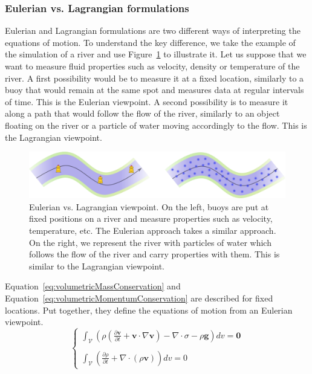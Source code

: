 \subsubsection{Eulerian vs. Lagrangian formulations}
\label{subsubsec:starMechanics_eulerianLagrangian}
Eulerian and Lagrangian formulations are two different ways of interpreting the equations of motion.
To understand the key difference, we take the example of the simulation of a river and use Figure~\ref{fig:EulerianVsLagrangian} to illustrate it.
Let us suppose that we want to measure fluid properties such as velocity, density or temperature of the river.
A first possibility would be to measure it at a fixed location, similarly to a buoy that would remain at the same spot and measures data at regular intervals of time. This is the Eulerian viewpoint. A second possibility is to measure it along a path that would follow the flow of the river, similarly to an object floating on the river or a particle of water moving accordingly to the flow. This is the Lagrangian viewpoint.
\begin{figure}[!ht]
	\centering
	\includegraphics[width=\linewidth]{images/continuum_mechanics/eulerianVsLagrangian.png}
	\caption[STAR mechanics: Eulerian vs. Lagrangian]{\label{fig:EulerianVsLagrangian} Eulerian vs. Lagrangian viewpoint. On the left, buoys are put at fixed positions on a river and measure properties such as velocity, temperature, etc. The Eulerian approach takes a similar approach. On the right, we represent the river with particles of water which follows the flow of the river and carry properties with them. This is similar to the Lagrangian viewpoint.}
\end{figure}
Equation~\eqref{eq:volumetricMassConservation} and Equation~\eqref{eq:volumetricMomentumConservation} are described for fixed locations. Put together, they define the equations of motion from an Eulerian viewpoint.
\begin{equation}
\label{eq:eulerianMotionEquation}
\left\lbrace
\begin{array}{l}
\displaystyle 
\int_{\mathcal{V}} 
\left( 
\rho \left( \frac{\partial\mathbf{v}}{\partial t} + \mathbf{v} \cdot \nabla \mathbf{v} \right)
- \nabla \cdot \sigma - \rho \mathbf{g}  \right) dv = \mathbf{0}
\\ \\
\displaystyle
\int_{\mathcal{V}} 
\left( \frac{\partial \rho}{\partial t} + \nabla \cdot \left( \rho  \mathbf{v} \right) \right) dv = 0
\end{array}
\right.
\end{equation}
